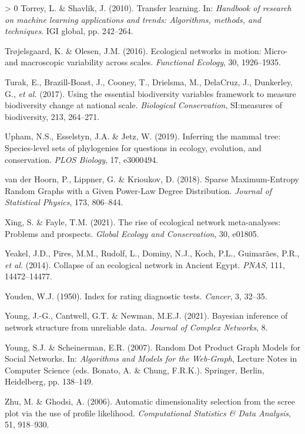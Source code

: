 \documentclass[10pt,oneside]{article}
\newlength{\cslhangindent}
\newenvironment{CSLReferences}[3] %
 {%
  \setlength{\parindent}{0pt}
  \ifodd #1 \everypar{\setlength{\hangindent}{\cslhangindent}}\ignorespaces\fi
  \ifnum #2 > 0
  \setlength{\parskip}{#2\baselineskip}
  \fi
 }%
 {}
\begin{document}
\begin{CSLReferences}{1}{0}
\leavevmode\hypertarget{ref-Torrey2010TraLea}{}%
Torrey, L. \& Shavlik, J. (2010). Transfer learning. In: \emph{Handbook
of research on machine learning applications and trends: Algorithms,
methods, and techniques}. IGI global, pp. 242--264.

\leavevmode\hypertarget{ref-Trojelsgaard2016EcoNet}{}%
Trøjelsgaard, K. \& Olesen, J.M. (2016). Ecological networks in motion:
Micro- and macroscopic variability across scales. \emph{Functional
Ecology}, 30, 1926--1935.

\leavevmode\hypertarget{ref-Turak2017UsiEss}{}%
Turak, E., Brazill-Boast, J., Cooney, T., Drielsma, M., DelaCruz, J.,
Dunkerley, G., \emph{et al.} (2017). Using the essential biodiversity
variables framework to measure biodiversity change at national scale.
\emph{Biological Conservation}, SI:measures of biodiversity, 213,
264--271.

\leavevmode\hypertarget{ref-Upham2019InfMam}{}%
Upham, N.S., Esselstyn, J.A. \& Jetz, W. (2019). Inferring the mammal
tree: Species-level sets of phylogenies for questions in ecology,
evolution, and conservation. \emph{PLOS Biology}, 17, e3000494.

\leavevmode\hypertarget{ref-vanderHoorn2018SpaMax}{}%
van der Hoorn, P., Lippner, G. \& Krioukov, D. (2018). Sparse
Maximum-Entropy Random Graphs with a Given Power-Law Degree
Distribution. \emph{Journal of Statistical Physics}, 173, 806--844.

\leavevmode\hypertarget{ref-Xing2021RisEco}{}%
Xing, S. \& Fayle, T.M. (2021). The rise of ecological network
meta-analyses: Problems and prospects. \emph{Global Ecology and
Conservation}, 30, e01805.

\leavevmode\hypertarget{ref-Yeakel2014ColEco}{}%
Yeakel, J.D., Pires, M.M., Rudolf, L., Dominy, N.J., Koch, P.L.,
Guimarães, P.R., \emph{et al.} (2014). Collapse of an ecological network
in Ancient Egypt. \emph{PNAS}, 111, 14472--14477.

\leavevmode\hypertarget{ref-Youden1950IndRat}{}%
Youden, W.J. (1950). Index for rating diagnostic tests. \emph{Cancer},
3, 32--35.

\leavevmode\hypertarget{ref-Young2021BayInf}{}%
Young, J.-G., Cantwell, G.T. \& Newman, M.E.J. (2021). Bayesian
inference of network structure from unreliable data. \emph{Journal of
Complex Networks}, 8.

\leavevmode\hypertarget{ref-Young2007RanDot}{}%
Young, S.J. \& Scheinerman, E.R. (2007). Random Dot Product Graph Models
for Social Networks. In: \emph{Algorithms and Models for the Web-Graph},
Lecture Notes in Computer Science (eds. Bonato, A. \& Chung, F.R.K.).
Springer, Berlin, Heidelberg, pp. 138--149.

\leavevmode\hypertarget{ref-Zhu2006AutDim}{}%
Zhu, M. \& Ghodsi, A. (2006). Automatic dimensionality selection from
the scree plot via the use of profile likelihood. \emph{Computational
Statistics \& Data Analysis}, 51, 918--930.

\end{CSLReferences}
\end{document}
